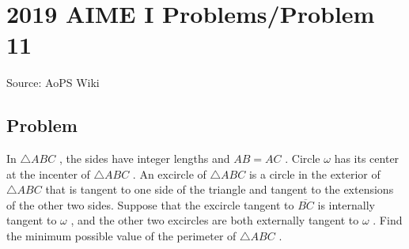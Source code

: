 \documentclass[12pt]{article}
\begin{document}
\section*{{2019 AIME I Problems/Problem 11}}
Source: AoPS Wiki

\subsection*{Problem}
In $\triangle ABC$ , the sides have integer lengths and $AB=AC$ . Circle $\omega$ has its center at the incenter of $\triangle ABC$ . An excircle of $\triangle ABC$ is a circle in the exterior of $\triangle ABC$ that is tangent to one side of the triangle and tangent to the extensions of the other two sides. Suppose that the excircle tangent to $\overline{BC}$ is internally tangent to $\omega$ , and the other two excircles are both externally tangent to $\omega$ . Find the minimum possible value of the perimeter of $\triangle ABC$ .
\end{document}
